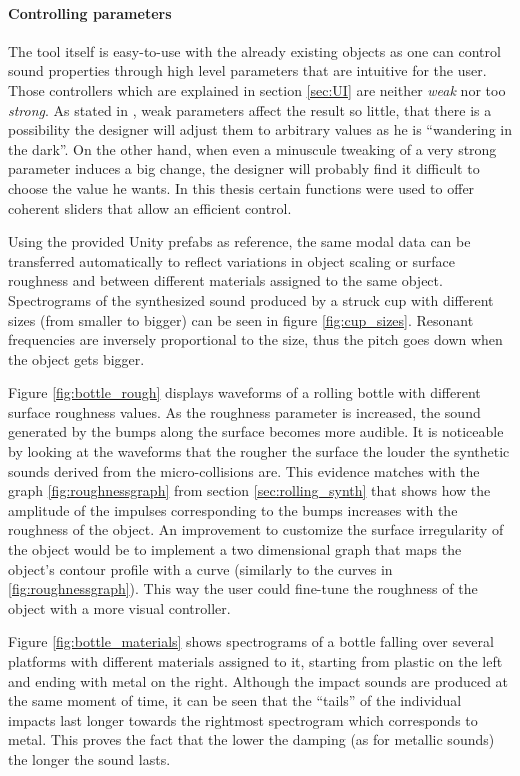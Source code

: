 \paragraph{Controlling parameters\\}

The tool itself is easy-to-use with the already existing objects as one can control sound properties through high level parameters that are intuitive for the user. Those controllers which are explained in section \ref{sec:UI} are neither \textit{weak} nor too \textit{strong}. As stated in \cite{jaffe1995ten}, weak parameters affect the result so little, that there is a possibility the designer will adjust them to arbitrary values as he is ``wandering in the dark''. On the other hand, when even a minuscule tweaking of a very strong parameter induces a big change, the designer will probably find it difficult to choose the value he wants. In this thesis certain functions were used to offer coherent sliders that allow an efficient control.

Using the provided Unity\textsuperscript{\textregistered} prefabs as reference, the same modal data can be transferred automatically to reflect variations in object scaling or surface roughness and between different materials assigned to the same object. Spectrograms of the synthesized sound produced by a struck cup with different sizes (from smaller to bigger) can be seen in figure \ref{fig:cup_sizes}. Resonant frequencies are inversely proportional to the size, thus the pitch goes down when the object gets bigger.

Figure \ref{fig:bottle_rough} displays waveforms of a rolling bottle with different surface roughness values. As the roughness parameter is increased, the sound generated by the bumps along the surface becomes more audible. It is noticeable by looking at the waveforms that the rougher the surface the louder the synthetic sounds derived from the micro-collisions are. This evidence matches with the graph \ref{fig:roughnessgraph} from section \ref{sec:rolling_synth} that shows how the amplitude of the impulses corresponding to the bumps increases with the roughness of the object. An improvement to customize the surface irregularity of the object would be to implement a two dimensional graph that maps the object's contour profile with a curve (similarly to the curves in \ref{fig:roughnessgraph}). This way the user could fine-tune the roughness of the object with a more visual controller.

Figure \ref{fig:bottle_materials} shows spectrograms of a bottle falling over several platforms with different materials assigned to it, starting from plastic on the left and ending with metal on the right. Although the impact sounds are produced at the same moment of time, it can be seen that the ``tails'' of the individual impacts last longer towards the rightmost spectrogram which corresponds to metal. This proves the fact that the lower the damping (as for metallic sounds) the longer the sound lasts.


